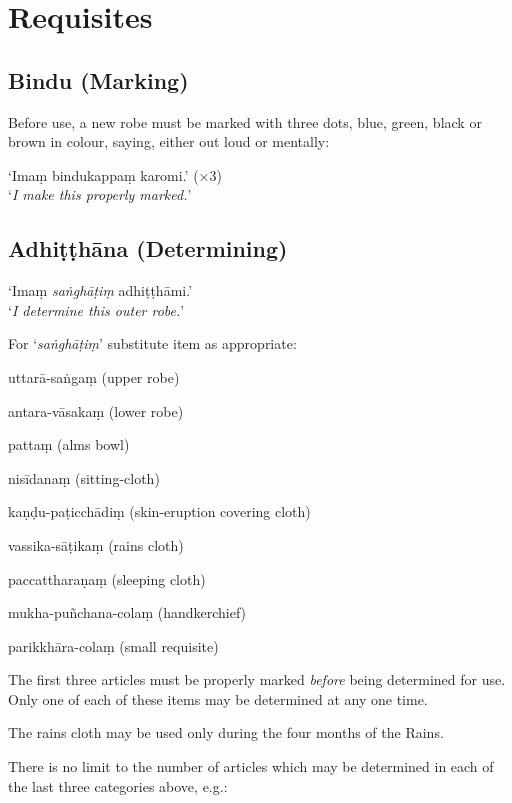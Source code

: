 \chapter{Requisites}

\section{Bindu (Marking)}

Before use, a new robe must be marked with three dots, \mbox{blue,} \mbox{green,} black or
brown in colour, saying, either out loud or mentally:

‘Imaṃ bindukappaṃ karomi.’ (×3)\\
‘\emph{I make this properly marked.}’ 

\section{Adhiṭṭhāna (Determining)}

‘Imaṃ \emph{saṅghāṭiṃ} adhiṭṭhāmi.’\\
‘\emph{I determine this outer robe.}’

For ‘\emph{saṅghāṭiṃ}’ substitute item as appropriate:

\begin{packeditemize}

\item uttarā-saṅgaṃ (upper robe)
\item antara-vāsakaṃ (lower robe)
\item pattaṃ (alms bowl)
\item nisīdanaṃ (sitting-cloth)
\item kaṇḍu-paṭicchādiṃ (skin-eruption covering cloth)
\item vassika-sāṭikaṃ (rains cloth)
\item paccattharaṇaṃ (sleeping cloth)
\item mukha-puñchana-colaṃ (handkerchief)
\item parikkhāra-colaṃ (small requisite)

\end{packeditemize}

The first three articles must be properly marked \emph{before} being determined
for use. Only one of each of these items may be determined at any one time.

The rains cloth may be used only during the four months of the Rains.

There is no limit to the number of articles which may be determined in each of
the last three categories above, e.g.:

